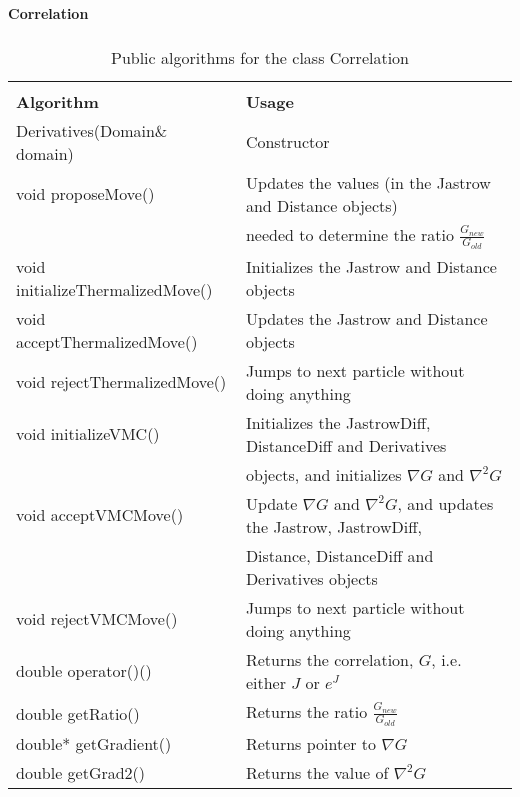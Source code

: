 \begin{table}[hbtp]
\begin{center} {\large \bf Correlation} \\ 
$\phantom{a}$ \\
\begin{tabular}{ll}
\hline\\ 
{\bf Algorithm}                 & {\bf Usage} \\
Derivatives(Domain\& domain)    &Constructor\\
void proposeMove()              &Updates the values (in the Jastrow and
Distance objects)\\
 & needed to determine the ratio $\frac{G_{new}}{G_{old}}$\\
void initializeThermalizedMove()&Initializes the Jastrow and Distance objects\\
void acceptThermalizedMove()    &Updates the Jastrow and Distance objects\\
void rejectThermalizedMove()    &Jumps to next particle without doing anything\\
void initializeVMC()            &Initializes the JastrowDiff, DistanceDiff 
              and Derivatives\\ 
&objects, and initializes $\nabla G$ and $\nabla^2 G$\\
void acceptVMCMove()            &Update $\nabla G$ and $\nabla^2 G$,
and updates the Jastrow, JastrowDiff,\\
& Distance, DistanceDiff and Derivatives objects\\
void rejectVMCMove()            &Jumps to next particle without doing anything\\
double operator()()             &Returns the correlation, $G$,
i.e. either $J$ or $e^J$\\
double getRatio()               &Returns the ratio $\frac{G_{new}}{G_{old}}$\\
double* getGradient()           &Returns pointer to $\nabla G$\\
double getGrad2()               &Returns the value of $\nabla^2 G$\\
\hline
\end{tabular} 
 \end{center}
  \caption{Public algorithms for the class Correlation}
\label{Correlation}
\end{table}

